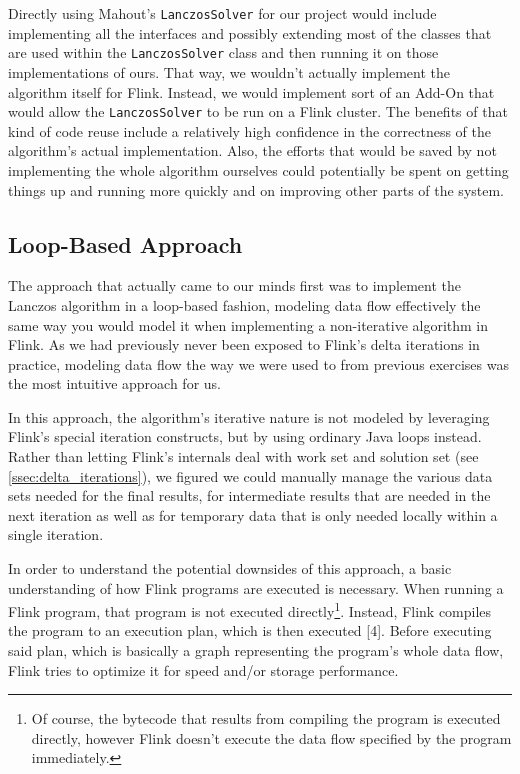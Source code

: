 
Directly using Mahout's \texttt{LanczosSolver} for our project would include
implementing all the interfaces and possibly extending most of the classes that
are used within the \texttt{LanczosSolver} class and then running it on those
implementations of ours. That way, we wouldn't actually implement the algorithm
itself for Flink. Instead, we would implement sort of an Add-On that would
allow the \texttt{LanczosSolver} to be run on a Flink cluster. The benefits of
that kind of code reuse include a relatively high confidence in the correctness
of the algorithm's actual implementation. Also, the efforts that would be saved
by not implementing the whole algorithm ourselves could potentially be spent on
getting things up and running more quickly and on improving other parts of the
system.



\subsection{Loop-Based Approach}
\label{ssec:loop_approach}

The approach that actually came to our minds first was to implement the Lanczos
algorithm in a loop-based fashion, modeling data flow effectively the same way
you would model it when implementing a non-iterative algorithm in Flink. As we
had previously never been exposed to Flink's delta iterations in practice,
modeling data flow the way we were used to from previous exercises was the most
intuitive approach for us.

In this approach, the algorithm's iterative nature is not modeled by leveraging
Flink's special iteration constructs, but by using ordinary Java loops instead.
Rather than letting Flink's internals deal with work set and solution set (see
\ref{ssec:delta_iterations}), we figured we could manually manage the various
data sets needed for the final results, for intermediate results that are
needed in the next iteration as well as for temporary data that is only needed
locally within a single iteration.


In order to understand the potential downsides of this approach, a basic
understanding of how Flink programs are executed is necessary. When running a
Flink program, that program is not executed directly\footnote{Of course, the
bytecode that results from compiling the program is executed directly, however
Flink doesn't execute the data flow specified by the program immediately.}.
Instead, Flink compiles the program to an execution plan, which is then
executed [4]. Before executing said plan, which is basically a graph
representing the program's whole data flow, Flink tries to optimize it for
speed and/or storage performance.

